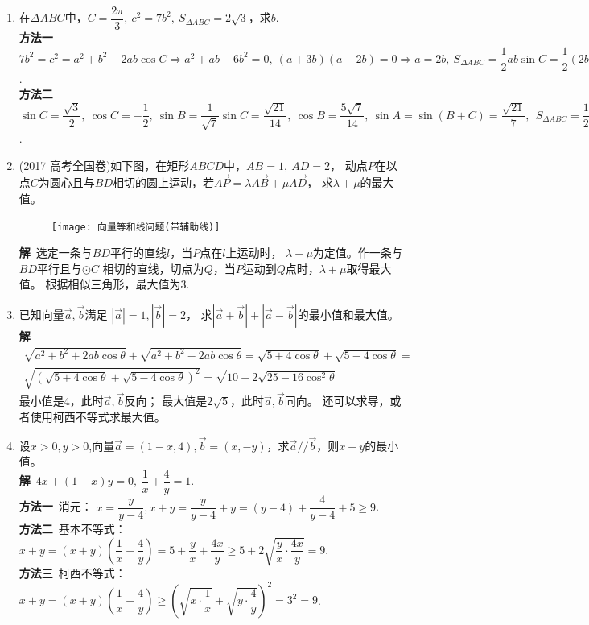 \begin{enumerate}[label={【\textbf{例\thechapter.\arabic*}】},
 leftmargin=\inteval{\myenumleftmargin}pt,
 itemsep=\inteval{\myenumitempsep}pt,
 itemindent=\inteval{\myenumitemindent}pt]
\item 在$ \Delta ABC $中，$ C=\dfrac{2\pi}{3},\ c^2=7b^2,\ S_{\Delta ABC}=
2\sqrt{3} $，求$ b $. \\
\textbf{方法一}\ $ 7b^2=c^2=a^2+b^2-2ab\cos C \Rightarrow a^2+ab-6b^2=0,\ (a+3b)
(a-2b)=0\Rightarrow a=2b,\ S_{\Delta ABC}=\dfrac{1}{2}ab\sin C=\dfrac{1}{2}(2b)b\dfrac{\sqrt{3}}{2}=2\sqrt{3},\ b=2  $. \\
\textbf{方法二}\ $ \sin C=\dfrac{\sqrt{3}}{2},\ \cos C=-\dfrac{1}{2},\ \sin B=
\dfrac{1}{\sqrt{7}}\sin C=\dfrac{\sqrt{21}}{14},\ \cos B=\dfrac{5\sqrt{7}}{14},
\ \sin A=\sin(B+C)=\dfrac{\sqrt{21}}{7},\ \ S_{\Delta ABC}=\dfrac{1}{2}bc\sin A=
\dfrac{1}{2}b(\sqrt{7}b)\dfrac{\sqrt{21}}{7}=2\sqrt{3},\ b=2 $. 

\item (2017 高考全国卷)如下图，在矩形$ ABCD $中，$ AB=1,\ AD=2 $，
动点$ P $在以点$ C $为圆心且与$ BD $相切的圆上运动，若$ \vec{AP}=
\lambda\vec{AB}+\mu\vec{AD} $，
求$ \lambda+\mu $的最大值。 
\begin{figure}[H]
    \centering
    \texttt{[image: 向量等和线问题(带辅助线)]}
\end{figure} 
\noindent\textbf{解}\ 选定一条与$ BD $平行的直线$ l $，当$ P $点在$ l $上运动时，
$ \lambda+\mu $为定值。作一条与$ BD $平行且与$ \odot C $
相切的直线，切点为$ Q $，当$ P $运动到$ Q $点时，$ \lambda+\mu $取得最大值。
根据相似三角形，最大值为3. 

\item 已知向量$ \vec{a},\vec{b} $满足
$ |\vec{a}|=1,|\vec{b}|=2$，
求$ |\vec{a}+\vec{b}|+|\vec{a}-
\vec{b}| $的最小值和最大值。\\
\textbf{解}\ 
\begin{gather*}
    \sqrt{a^2+b^2+2ab\cos\theta}+\sqrt{a^2+b^2-2ab\cos\theta}=
    \sqrt{5+4\cos\theta}+\sqrt{5-4\cos\theta}=\\
    \sqrt{\left(\sqrt{5+4\cos\theta}+\sqrt{5-4\cos\theta} 
        \right)^2}=\sqrt{10+2\sqrt{25-16\cos^2\theta}}
\end{gather*}
最小值是4，此时$ \vec{a},\vec{b} $反向；
最大值是$ 2\sqrt{5} $，此时$ \vec{a},\vec{b} $同向。
还可以求导，或者使用柯西不等式求最大值。

\item 设$ x>0,y>0 $,向量$ \vec{a}=(1-x,4),\vec{b}=
(x,-y) $，求$ \vec{a}//\vec{b} $，则$ x+y $的最小值。\\
\textbf{解}\ $ 4x+(1-x)y=0,\ \dfrac{1}{x}+\dfrac{4}{y}=1 $. \\
\textbf{方法一}\ 消元：
$ x=\dfrac{y}{y-4},x+y=\dfrac{y}{y-4}+y=(y-4)+\dfrac{4}{y-4}+5\geq 9 $. \\
\textbf{方法二}\ 基本不等式：
$ x+y=(x+y)(\dfrac{1}{x}+\dfrac{4}{y})=5+\dfrac{y}{x}+\dfrac{4x}{y}
\geq 5+ 2\sqrt{\dfrac{y}{x}\cdot \dfrac{4x}{y}}=9 $. \\
\textbf{方法三}\ 柯西不等式：$ x+y=(x+y)(\dfrac{1}{x}+\dfrac{4}{y})
\geq \left( \sqrt{x\cdot \dfrac{1}{x}}+
\sqrt{y\cdot \dfrac{4}{y}}\right) ^2=3^2=9 $. 


\end{enumerate}
